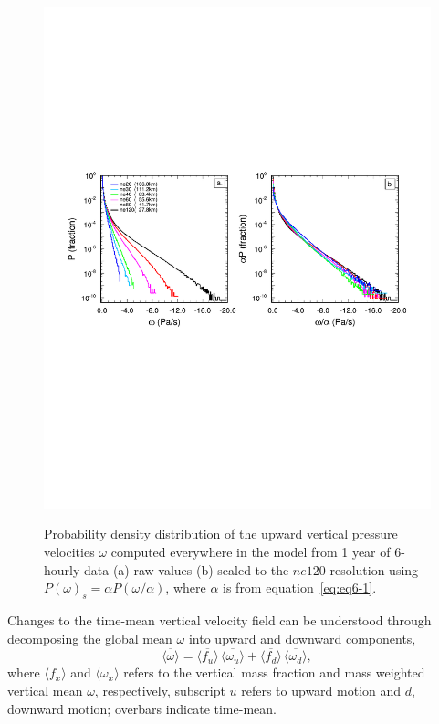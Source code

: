 \begin{figure}[t]
\begin{center}
\noindent\includegraphics[width=33pc,angle=0]{chapter6/temp_2pdf.pdf}\\
\end{center}
\caption{Probability density distribution of the upward vertical pressure velocities $\omega$ computed everywhere in the model from 1 year of 6-hourly data (a) raw values (b) scaled to the $ne120$ resolution using $P(\omega)_s = \alpha P (\omega / \alpha)$, where $\alpha$ is from equation~\ref{eq:eq6-1}.}
\label{fig:2pdf}
\end{figure}

Changes to the time-mean vertical velocity field can be understood through decomposing the global mean $\omega$ into upward and downward components,
\begin{equation}
\overline{\langle \omega \rangle} = \overline{\langle f_{u} \rangle} \, \overline{\langle \omega_{u} \rangle} + \overline{\langle f_{d} \rangle} \, \overline{\langle \omega_{d} \rangle}, \label{eq:eq6-2}
\end{equation}
where $\langle f_x \rangle$ and $\langle \omega_x \rangle$ refers to the vertical mass fraction and mass weighted vertical mean $\omega$, respectively, subscript $u$ refers to upward motion and $d$, downward motion; overbars indicate time-mean.

